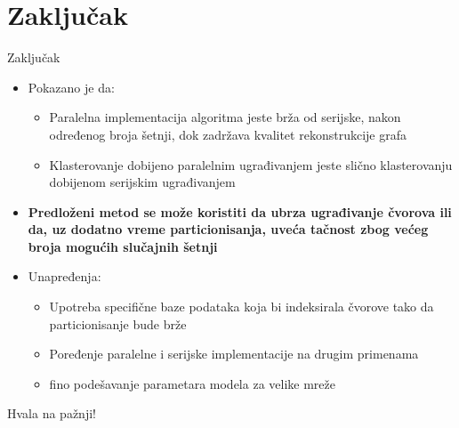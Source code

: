 \documentclass{beamer}
\begin{document}
\section{Zaključak}
\begin{frame}{Zaključak}
    \begin{itemize}
        \item Pokazano je da:
        \begin{itemize}
            \item Paralelna implementacija algoritma jeste brža od serijske, nakon određenog broja šetnji, dok zadržava kvalitet rekonstrukcije grafa
            \item Klasterovanje dobijeno paralelnim ugrađivanjem jeste slično klasterovanju dobijenom serijskim ugrađivanjem
        \end{itemize}
        \item \textbf{Predloženi metod se može koristiti da ubrza ugrađivanje čvorova ili da, uz dodatno vreme particionisanja, uveća tačnost zbog većeg broja mogućih slučajnih šetnji}
        \item Unapređenja:
        \begin{itemize}
            \item Upotreba specifične baze podataka koja bi indeksirala čvorove tako da particionisanje bude brže
            \item Poređenje paralelne i serijske implementacije na drugim primenama
            \item fino podešavanje parametara modela za velike mreže 
        \end{itemize}
    \end{itemize}
\end{frame}



\begin{frame}
	\begin{center}
		\Huge Hvala na pažnji!
	\end{center}
\end{frame}
\end{document}
